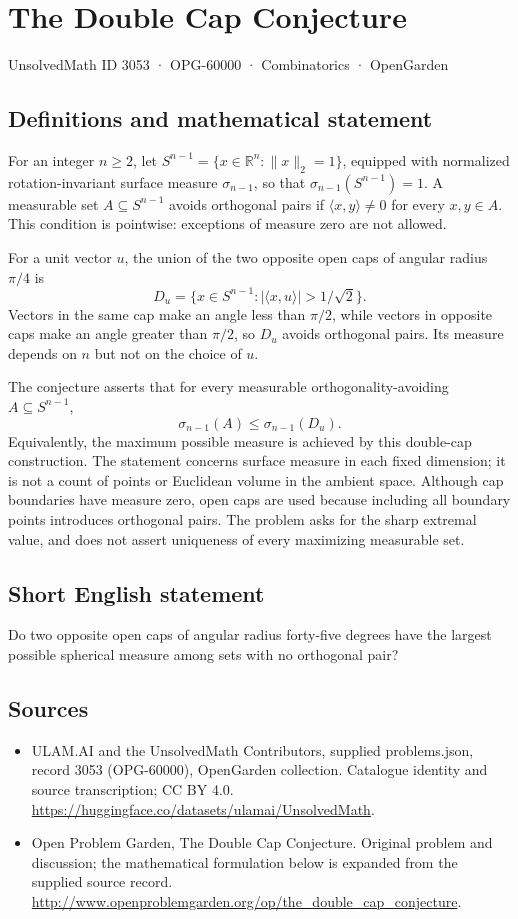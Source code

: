 \documentclass[11pt,a4paper]{article}
\begin{document}
\section*{The Double Cap Conjecture}\label{3053}
{\small UnsolvedMath ID 3053 · OPG-60000 · Combinatorics · OpenGarden}
\subsection{Definitions and mathematical statement}
For an integer $n\ge2$, let
$S^{n-1}=\{x\in\mathbb R^n:\|x\|_2=1\}$, equipped with normalized
rotation-invariant surface measure $\sigma_{n-1}$, so that
$\sigma_{n-1}(S^{n-1})=1$. A measurable set $A\subseteq S^{n-1}$ avoids
orthogonal pairs if $\langle x,y\rangle\ne0$ for every $x,y\in A$.
This condition is pointwise: exceptions of measure zero are not allowed.

For a unit vector $u$, the union of the two opposite open caps of angular
radius $\pi/4$ is
\[
 D_u=\{x\in S^{n-1}:|\langle x,u\rangle|>1/\sqrt2\}.
\]
Vectors in the same cap make an angle less than $\pi/2$, while vectors
in opposite caps make an angle greater than $\pi/2$, so $D_u$ avoids
orthogonal pairs. Its measure depends on $n$ but not on the choice of $u$.

The conjecture asserts that for every measurable orthogonality-avoiding
$A\subseteq S^{n-1}$,
\[
 \sigma_{n-1}(A)\le\sigma_{n-1}(D_u).
\]
Equivalently, the maximum possible measure is achieved by this double-cap
construction. The statement concerns surface measure in each fixed
dimension; it is not a count of points or Euclidean volume in the ambient
space. Although cap boundaries have measure zero, open caps are used because
including all boundary points introduces orthogonal pairs. The problem
asks for the sharp extremal value, and does not assert uniqueness of every
maximizing measurable set.
\subsection{Short English statement}
Do two opposite open caps of angular radius forty-five degrees have the largest possible spherical measure among sets with no orthogonal pair?
\subsection{Sources}
\begin{itemize}
\item[S1] ULAM.AI and the UnsolvedMath Contributors, supplied problems.json, record 3053 (OPG-60000), OpenGarden collection. Catalogue identity and source transcription; CC BY 4.0.
\url{https://huggingface.co/datasets/ulamai/UnsolvedMath}.
\item[S2] Open Problem Garden, The Double Cap Conjecture. Original problem and discussion; the mathematical formulation below is expanded from the supplied source record.
\url{http://www.openproblemgarden.org/op/the_double_cap_conjecture}.
\end{itemize}
\end{document}

